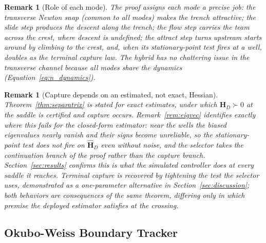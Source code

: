 \documentclass[12pt, letterpaper, oneside]{report}
\newtheorem{remark}[theorem]{Remark}
\begin{document}
\begin{remark}[Role of each mode]
The proof assigns each mode a precise job: the transverse Newton snap
(common to all modes) makes the trench attractive; the slide step
produces the descent along the trench; the flow step carries the team
across the crest, where descent is undefined; the attract step turns
upstream starts around by climbing to the crest, and, when its
stationary-point test fires at a well, doubles as the terminal capture
law. The hybrid has no chattering issue in the transverse channel
because all modes share the dynamics (Equation~\eqref{eq:n_dynamics}).
\end{remark}

\begin{remark}[Capture depends on an estimated, not exact, Hessian]
\label{rem:capture_gap}
Theorem~\ref{thm:separatrix} is stated for exact estimates, under which
$\mathbf{H}_D\succ0$ at the saddle is certified and capture occurs.
Remark~\ref{rem:eigvec} identifies exactly where this fails for the
closed-form estimator: near the wells the biased eigenvalues nearly
vanish and their signs become unreliable, so the stationary-point test
does not fire on $\hat{\mathbf{H}}_D$ even without noise, and the
selector takes the continuation branch of the proof rather than the
capture branch. Section~\ref{sec:results} confirms this is what the
simulated controller does at every saddle it reaches. Terminal capture
is recovered by tightening the test the selector uses, demonstrated as
a one-parameter alternative in Section~\ref{sec:discussion}; both
behaviors are consequences of the same theorem, differing only in
which premise the deployed estimator satisfies at the crossing.
\end{remark}

\subsection{Okubo-Weiss Boundary Tracker}
\label{sec:stab_ow}
\end{document}
